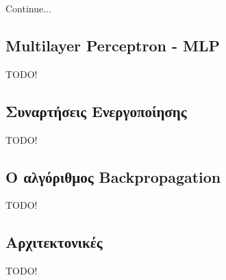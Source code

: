 Continue...

\subsection{Multilayer Perceptron - MLP}

TODO!

\subsection{Συναρτήσεις Ενεργοποίησης}

TODO!

\subsection{Ο αλγόριθμος Backpropagation}

TODO!

\subsection{Αρχιτεκτονικές}

TODO!
